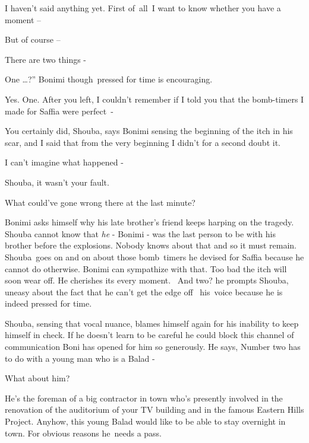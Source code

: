 \documentclass[letterpaper]{article}
\begin{document}
{\textquotedbl}I haven't said anything yet. First of\ all\ I want to know whether you have a moment --{\textquotedbl}

{\textquotedbl}But of course --{\textquotedbl} 

{\textquotedbl}There are two things -{\textquotedbl}

{\textquotedbl}One {\dots}?'' Bonimi though~pressed for time is encouraging. 

{\textquotedbl}Yes. One. After you left, I couldn't remember if I told you that the bomb-timers I made for Saffia were
perfect~-{\textquotedbl} 

{\textquotedbl}You certainly did, Shouba,{\textquotedbl} says Bonimi sensing the beginning of the itch in his scar,
{\textquotedbl}and I said that from the very beginning I didn't for a second doubt it.{\textquotedbl}

{\textquotedbl}I can't imagine what happened - {\textquotedbl}

{\textquotedbl}Shouba, it wasn't your fault.{\textquotedbl} 

{\textquotedbl}What could've gone wrong there at the last minute?{\textquotedbl}

Bonimi asks himself why his late brother's friend keeps harping on the tragedy. Shouba cannot know that \textit{he} -
Bonimi - was the last person to be with his brother before the explosions. Nobody knows about that and so it must
remain. Shouba\ goes on and on about those bomb\ timers he devised for Saffia because he cannot do otherwise. Bonimi
can sympathize with that. Too bad the itch will soon wear off. He cherishes its every moment. ~{\textquotedbl}And
two?{\textquotedbl} he prompts Shouba, uneasy about the fact that he can't get the edge off \ his\ voice because he is
indeed pressed for time.\ \ 

Shouba, sensing that vocal nuance, blames himself again for his inability to keep himself in check. If he doesn't learn
to be careful he could block this channel of communication Boni has opened for him so generously. He says,
{\textquotedbl}Number two has to do with a young man who is a Balad -{\textquotedbl}

{\textquotedbl}What about him?{\textquotedbl}

{\textquotedbl}He's the foreman of a big contractor in town who's presently involved in the renovation of the auditorium
of your TV building and in the famous Eastern Hills Project. Anyhow, this young Balad would like to be able to stay
overnight in town. For obvious reasons he~needs a pass.{\textquotedbl}
\end{document}
